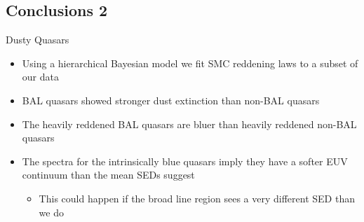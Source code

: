 \documentclass[landscape,9pt]{beamer}
\begin{document}
\subsection{Conclusions 2}
\begin{frame}
	\begin{block}{Dusty Quasars}
	\begin{itemize}
		\item<1> Using a hierarchical Bayesian model we fit SMC reddening laws to a subset of our data
		\item<1> BAL quasars showed stronger dust extinction than non-BAL quasars
		\item<1> The heavily reddened BAL quasars are bluer than heavily reddened non-BAL quasars
		\item<2> The spectra for the intrinsically blue quasars imply they have a softer EUV continuum than the mean SEDs suggest
		\begin{itemize}
			\item This could happen if the broad line region sees a very different SED than we do
		\end{itemize}
	\end{itemize}
	\end{block}
\end{frame}
\end{document}

